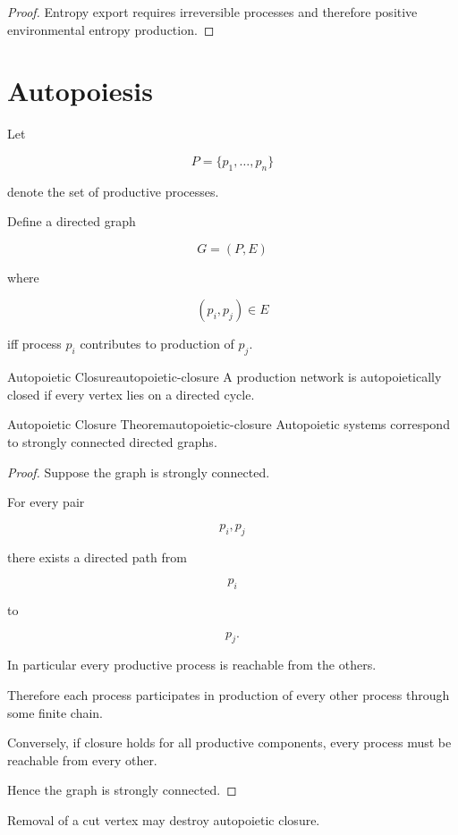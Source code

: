 \documentclass[12pt,twoside,openright]{book}
\begin{document}
\begin{proof}
Entropy export requires irreversible processes and
therefore positive environmental entropy production.
\end{proof}
\section{Autopoiesis}

Let

\[
P
=
\{p_1,\ldots,p_n\}
\]

denote the set of productive processes.

Define a directed graph

\[
G=(P,E)
\]

where

\[
(p_i,p_j)\in E
\]

iff process \(p_i\) contributes to production of
\(p_j\).

\begin{definition}{Autopoietic Closure}{autopoietic-closure}
A production network is autopoietically closed if every
vertex lies on a directed cycle.
\end{definition}

\begin{theorem}{Autopoietic Closure Theorem}{autopoietic-closure}
Autopoietic systems correspond to strongly connected
directed graphs.
\end{theorem}

\begin{proof}
Suppose the graph is strongly connected.

For every pair

\[
p_i,p_j
\]

there exists a directed path from

\[
p_i
\]

to

\[
p_j.
\]

In particular every productive process is reachable from
the others.

Therefore each process participates in production of every
other process through some finite chain.

Conversely, if closure holds for all productive
components, every process must be reachable from every
other.

Hence the graph is strongly connected.
\end{proof}

\begin{corollary}
Removal of a cut vertex may destroy autopoietic closure.
\end{corollary}
\end{document}
